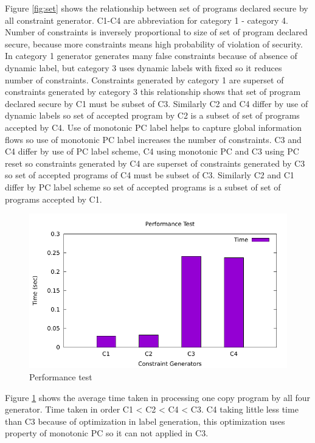 Figure \ref{fig:set} shows the relationship between set of programs declared secure by all constraint generator. C1-C4 are abbreviation for category 1 - category 4. Number of constraints is inversely proportional to size of set of program declared secure, because more constraints means high probability of violation of security. In category 1 generator generates many false constraints because of absence of dynamic label, but category 3 uses dynamic labels with fixed so it reduces number of constraints. Constraints generated by category 1 are superset of constraints generated by category 3 this relationship shows that set of program declared secure by C1 must be subset of C3. Similarly C2 and C4 differ by use of dynamic labels so set of accepted program by C2 is a subset of set of programs accepted by C4. Use of monotonic PC label helps to capture global information flows so use of monotonic PC label increases the number of constraints. C3 and C4 differ by use of PC label scheme, C4 using monotonic PC and C3 using PC reset so constraints generated by C4 are superset of constraints generated by C3 so set of accepted programs of C4 must be subset of C3. Similarly C2 and C1 differ by PC label scheme so set of accepted programs is a subset of set of programs accepted by C1.    
\begin{figure}
	\includegraphics[width=1\textwidth]{graph.pdf}
	\centering
	\caption{Performance test}
	\label{fig:ptest}
\end{figure}
Figure \ref{fig:ptest} shows the average time taken in processing one copy program by all four generator. 
Time taken in order C1 < C2 < C4 < C3. C4 taking little less time than C3 because of optimization in label generation, this optimization uses property of monotonic PC so it can not applied in C3.
